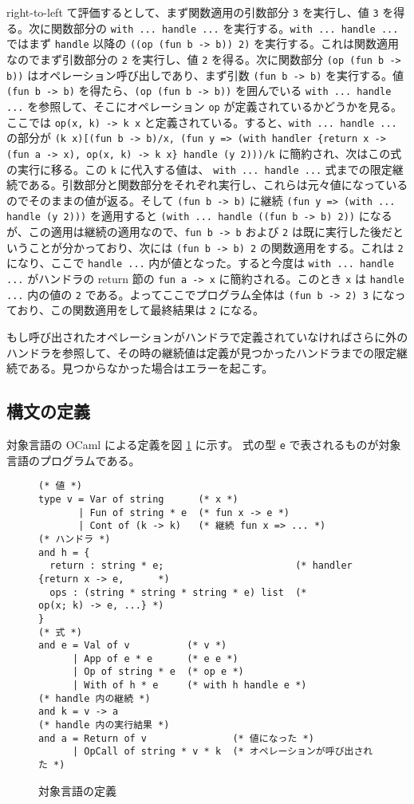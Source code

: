 right-to-left て評価するとして、まず関数適用の引数部分 \texttt{3} を実行し、値 \texttt{3} を得る。次に関数部分の \texttt{with ... handle ...} を実行する。\texttt{with ... handle ...} ではまず \texttt{handle} 以降の \texttt{((op (fun b -> b)) 2)} を実行する。これは関数適用なのでまず引数部分の \texttt{2} を実行し、値 \texttt{2} を得る。次に関数部分 \texttt{(op (fun b -> b))} はオペレーション呼び出しであり、まず引数 \texttt{(fun b -> b)} を実行する。値 \texttt{(fun b -> b)} を得たら、\texttt{(op (fun b -> b))} を囲んでいる \texttt{with ... handle ...} を参照して、そこにオペレーション \texttt{op} が定義されているかどうかを見る。ここでは \texttt{op(x, k) -> k x} と定義されている。すると、\texttt{with ... handle ...} の部分が \texttt{(k x)[(fun b -> b)/x, (fun y => (with handler \{return x -> (fun a -> x), op(x, k) -> k x\} handle (y 2)))/k} に簡約され、次はこの式の実行に移る。この \texttt{k} に代入する値は、 \texttt{with ... handle ...} 式までの限定継続である。引数部分と関数部分をそれぞれ実行し、これらは元々値になっているのでそのままの値が返る。そして \texttt{(fun b -> b)} に継続 \texttt{(fun y => (with ... handle (y 2)))} を適用すると \texttt{(with ... handle ((fun b -> b) 2))} になるが、この適用は継続の適用なので、\texttt{fun b -> b} および \texttt{2} は既に実行した後だということが分かっており、次には \texttt{(fun b -> b) 2} の関数適用をする。これは \texttt{2} になり、ここで \texttt{handle ...} 内が値となった。すると今度は \texttt{with ... handle ...} がハンドラの return 節の \texttt{fun a -> x} に簡約される。このとき \texttt{x} は \texttt{handle ...} 内の値の \texttt{2} である。よってここでプログラム全体は \texttt{(fun b -> 2) 3} になっており、この関数適用をして最終結果は \texttt{2} になる。

もし呼び出されたオペレーションがハンドラで定義されていなければさらに外のハンドラを参照して、その時の継続値は定義が見つかったハンドラまでの限定継続である。見つからなかった場合はエラーを起こす。

\subsection{構文の定義}
\label{subsection:syntax}

対象言語の OCaml による定義を図 \ref{figure:syntax} に示す。
式の型 \texttt{e} で表されるものが対象言語のプログラムである。

\begin{figure}
\begin{verbatim}
(* 値 *)
type v = Var of string      (* x *)
       | Fun of string * e  (* fun x -> e *)
       | Cont of (k -> k)   (* 継続 fun x => ... *)
(* ハンドラ *)
and h = {
  return : string * e;                       (* handler {return x -> e,      *)
  ops : (string * string * string * e) list  (*          op(x; k) -> e, ...} *)
}
(* 式 *)
and e = Val of v          (* v *)
      | App of e * e      (* e e *)
      | Op of string * e  (* op e *)
      | With of h * e     (* with h handle e *)
(* handle 内の継続 *)
and k = v -> a
(* handle 内の実行結果 *)
and a = Return of v               (* 値になった *)
      | OpCall of string * v * k  (* オペレーションが呼び出された *)
\end{verbatim}
\caption{対象言語の定義}
\label{figure:syntax}
\end{figure}


